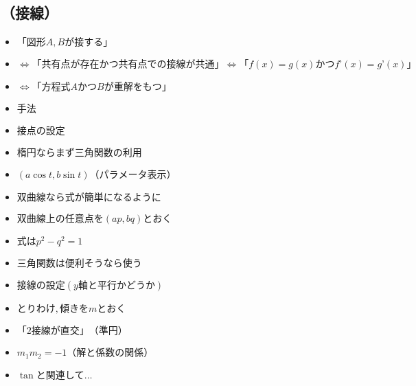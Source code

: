 \documentclass[dvipdfmx,uplatex]{jsarticle}
\begin{document}
\subsection{（接線）}
\begin{itemize}
	\item $ 「図形A,Bが接する」$
	\item $ \Leftrightarrow「共有点が存在かつ共有点での接線が共通」⇔「f(x) = g(x) かつ f’(x) = g’(x)」$
	\item $ \Leftrightarrow「方程式AかつBが重解をもつ」$
	\item $ 手法$
		\item $ 接点の設定$
			\item $ 楕円ならまず三角関数の利用$
				\item $ (a\cos t, b\sin t)（パラメータ表示）$
			\item $ 双曲線なら式が簡単になるように$
				\item $ 双曲線上の任意点を(ap, bq)とおく$
					\item $ 式はp^2 - q^2 = 1$
				\item $ 三角関数は便利そうなら使う$
		\item $ 接線の設定 (y軸と平行かどうか)$
			\item $ とりわけ,傾きをmとおく$
				\item $ 「2接線が直交」（準円）$
				\item $ m_1m_2 = -1（解と係数の関係）$
			\item $ \tan と関連して…$
\end{itemize}
\end{document}
